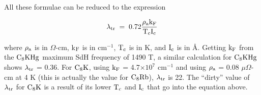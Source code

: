         All these formulae can be reduced to the expression 

\[ \rm \lambda_{tr} \; = \; 0.72 \frac{\rho_a k_F}{T_c I_c}
\]

\noindent where $\rm \rho_a$ is in $\Omega$-cm, k$\rm _F$ is in cm$^{-1}$,
$\rm T_c$  is in  K, and $\rm  I_c$ is in  \AA.  Getting $\rm k_F$ from the
$\rm  C_8KHg$  maximum SdH   frequency of  1490   T,\cite{W179}   a similar
calculation for  $\rm C_8KHg$ shows  $\rm \lambda_{tr}$   = 0.36.  For $\rm
C_8K$, using $\rm k_F$  =  4.7$\times 10^{7}$  cm$^{-1}$\cite{takada82} and
using $\rm \rho_a$  =  0.08 $\mu \Omega$-cm at  4  K (this  is actually the
value  for $\rm  C_8Rb$\cite{guerard77}),  $\rm  \lambda_{tr}$  is 22.   The
``dirty'' value of  $\rm \lambda_{tr}$ for $\rm  C_8K$ is  a result of  its
lower $\rm T_c$ and $\rm I_c$ that go into the equation above.
